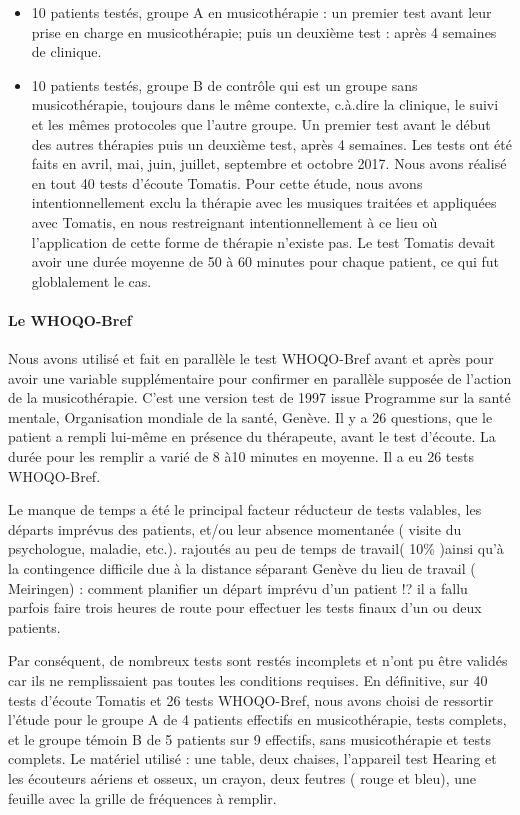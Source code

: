 \begin{itemize}
	\item 10 patients testés, groupe A en musicothérapie : un
          premier test avant leur prise en charge en musicothérapie;
          puis un deuxième test \textdegree{} : après 4 semaines de
          clinique.
	\item 10 patients testés, groupe B de contrôle qui est un groupe sans musicothérapie,
	toujours dans le même contexte, c.à.dire la clinique, le suivi et les mêmes protocoles que l'autre groupe. Un premier test avant
	le début des autres thérapies puis un deuxième test, après 4 semaines. 
	Les tests ont été faits en avril, mai, juin, juillet, septembre et octobre 2017.
	Nous avons réalisé en tout 40 tests d'écoute Tomatis. Pour cette étude, nous avons intentionnellement exclu la thérapie avec les musiques traitées et appliquées avec Tomatis, en nous restreignant  intentionnellement à ce lieu où l'application de cette forme de thérapie n'existe pas.
	Le test Tomatis devait avoir une durée  moyenne de 50 à 60  minutes pour chaque patient, ce qui fut globlalement le cas.
\end{itemize}

\paragraph{Le WHOQO-Bref}

Nous avons utilisé et fait en parallèle le test WHOQO-Bref avant et
après pour avoir une variable supplémentaire pour confirmer en
parallèle supposée de l'action de la musicothérapie.  C'est une
version test de 1997 issue Programme sur la santé mentale,
Organisation mondiale de la santé, Genève. Il y a 26 questions, que le
patient a rempli lui-même en présence du thérapeute, avant le test
d'écoute. La durée pour les remplir a varié de 8 à10 minutes en
moyenne.  Il a eu 26 tests WHOQO-Bref.

Le manque de temps a été le principal facteur  réducteur
de tests valables, les départs imprévus des patients, et/ou leur
absence momentanée ( visite du psychologue, maladie, etc.). rajoutés au peu de temps de travail( 10\% )ainsi qu'à la
contingence difficile due à la distance séparant Genève du lieu de travail ( Meiringen)
: comment planifier un départ imprévu d'un patient !? il a fallu parfois
faire trois heures de route pour effectuer les tests finaux d'un ou deux
patients.
  
Par conséquent,  de nombreux tests sont restés 
incomplets et n'ont pu
être validés car ils ne remplissaient pas toutes les conditions requises.  En définitive, sur 40 tests d'écoute Tomatis et 26 tests
WHOQO-Bref, nous avons choisi de ressortir l'étude pour le groupe A de
4 patients effectifs en musicothérapie, tests complets, et le groupe
témoin B de 5 patients sur 9 effectifs, sans musicothérapie et tests
complets.  Le matériel utilisé : une table, deux chaises, l'appareil
test Hearing et les écouteurs aériens et osseux, un crayon, deux
feutres ( rouge et bleu), une feuille avec la grille de fréquences à
remplir.
 
